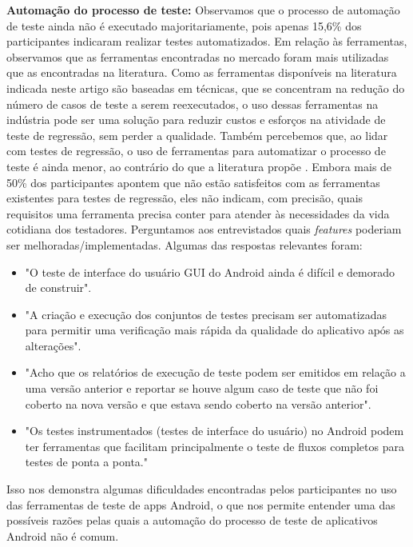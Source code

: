 \textbf{Automação do processo de teste:} Observamos que o processo de automação de teste ainda não é executado majoritariamente, pois apenas 15,6\% dos participantes indicaram realizar testes automatizados. Em relação às ferramentas, observamos que as ferramentas encontradas no mercado foram mais utilizadas que as encontradas na literatura. Como as ferramentas disponíveis na literatura indicada neste artigo são baseadas em técnicas, que se concentram na redução do número de casos de teste a serem reexecutados, o uso dessas ferramentas na indústria pode ser uma solução para reduzir custos e esforços na atividade de teste de regressão, sem perder a qualidade. Também percebemos que, ao lidar com testes de regressão, o uso de ferramentas para automatizar o processo de teste é ainda menor, ao contrário do que a literatura propõe \cite{Ammann:2008:IST:1355340}. Embora mais de 50\% dos participantes apontem que não estão satisfeitos com as ferramentas existentes para testes de regressão, eles não indicam, com precisão, quais requisitos uma ferramenta precisa conter para atender às necessidades da vida cotidiana dos testadores. Perguntamos aos entrevistados quais \textit{features} poderiam ser melhoradas/implementadas. Algumas das respostas relevantes foram:

\begin{itemize}    

    \item "O teste de interface do usuário \ac{GUI} do Android ainda é difícil e demorado de construir".
    
    \item"A criação e execução dos conjuntos de testes precisam ser automatizadas para permitir uma verificação mais rápida da qualidade do aplicativo após as alterações". 
    
    \item "Acho que os relatórios de execução de teste podem ser emitidos em relação a uma versão anterior e reportar se houve algum caso de teste que não foi coberto na nova versão e que estava sendo coberto na versão anterior".
    
    \item "Os testes instrumentados (testes de interface do usuário) no Android podem ter ferramentas que facilitam principalmente o teste de fluxos completos para testes de ponta a ponta."
    
\end{itemize}

Isso nos demonstra algumas dificuldades encontradas pelos participantes no uso das ferramentas de teste de apps Android, o que nos permite entender uma das possíveis razões pelas quais a automação do processo de teste de aplicativos Android não é comum.


